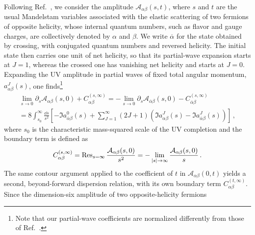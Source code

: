Following Ref.~\cite{Remmen:2020uze}, we consider the amplitude $\mathcal{A}_{\alpha\beta}(s,t)$,
where $s$ and $t$ are the usual Mandelstam variables associated with the elastic scattering of two
fermions of opposite helicity, whose internal quantum numbers, such as flavor and gauge charges, are
collectively denoted by $\alpha$ and $\beta$. We write $\overline\alpha$ for the state obtained by
crossing, with conjugated quantum numbers and reversed helicity. The initial state then carries one
unit of net helicity, so that its partial-wave expansion starts at $J=1$, whereas the crossed one has
vanishing net helicity and starts at $J=0$. Expanding the UV amplitude in partial waves of fixed
total angular momentum, $a_{\alpha\beta}^{J}(s)$, one finds\footnote{Note that our partial-wave coefficients are normalized
differently from those of Ref.~\cite{Remmen:2020uze}.}
\begin{multline}\label{eq: sum rules with boundary}
        \lim_{s\to 0}\partial_s\mathcal{A}_{\alpha\beta}(s,0)+C_{\alpha\beta}^{(s,\infty)}=-\lim_{s\to 0}\partial_s\mathcal{A}_{\overline \alpha\beta}(s,0)-C_{\overline\alpha\beta}^{(s,\infty)} \\
        =8\int_{s_0}^\infty \frac{\dd s}{s^2}\left[-\Im a_{\overline{\alpha}\beta}^{0}(s)+\sum_{J=1}^\infty(2J+1)\left(\Im a_{\alpha\beta}^{J}(s)-\Im a_{\overline{\alpha}\beta}^{J}(s)\right)\right]\,,
\end{multline}
where $s_0$ is the characteristic mass-squared scale of the UV completion and the boundary term is
defined as
\begin{equation}
    C_{\alpha\beta}^{(s,\infty)}=\Res_{s=\infty}\frac{\mathcal{A}_{\alpha\beta}(s,0)}{s^2}=-\lim_{\abs{s}\to \infty}\frac{\mathcal{A}_{\alpha\beta}(s,0)}{s}\,.
\end{equation}
The same contour argument applied to the coefficient of $t$ in $\mathcal{A}_{\alpha\beta}(0,t)$
yields a second, beyond-forward dispersion relation, with its own boundary term
$C^{(t,\infty)}_{\alpha\beta}$. Since the dimension-six amplitude of two opposite-helicity fermions

